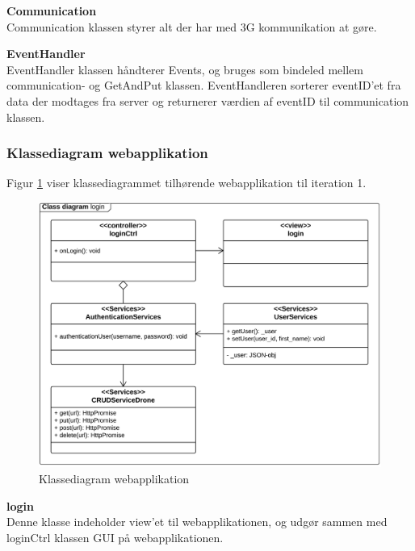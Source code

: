 \textbf{Communication} \\
Communication klassen styrer alt der har med 3G kommunikation at gøre.

\textbf{EventHandler} \\
EventHandler klassen håndterer Events, og bruges som bindeled mellem communication- og GetAndPut klassen. EventHandleren sorterer eventID'et fra data der modtages fra server og returnerer værdien af eventID til communication klassen. 


\newpage

\subsubsection*{Klassediagram webapplikation}
\vspace{-0.3cm}
Figur \ref{fig:classDiagram_webapplikation} viser klassediagrammet tilhørende webapplikation til iteration 1.

\vspace{-0.2cm}
\begin{figure}[H]
	\centering
	\includegraphics[width=1\textwidth]{Billeder/klasse_diagrammer/login_class_diagram.png}
	\vspace{-0.6cm}
	\caption{Klassediagram webapplikation}
	\label{fig:classDiagram_webapplikation}
\end{figure}

\vspace{-0.2cm}

\textbf{login} \\
Denne klasse indeholder view'et til webapplikationen, og udgør sammen med loginCtrl klassen GUI på webapplikationen. 

